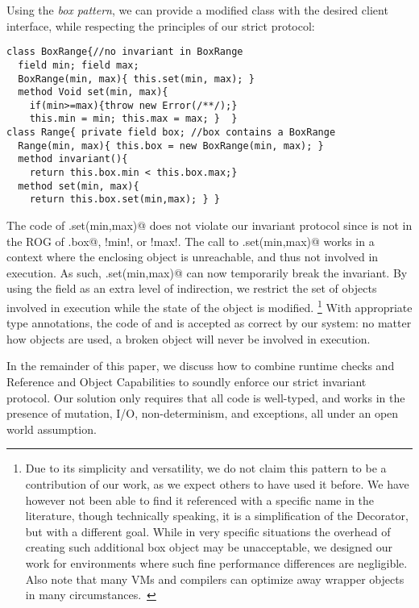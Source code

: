 Using the \emph{box pattern}, we can provide a modified
\Q@Range@ class with the desired client interface, while respecting the principles of our strict protocol:
\begin{lstlisting}
class BoxRange{//no invariant in BoxRange
  field min; field max;
  BoxRange(min, max){ this.set(min, max); }
  method Void set(min, max){
    if(min>=max){throw new Error(/**/);}
    this.min = min; this.max = max; }  }
class Range{ private field box; //box contains a BoxRange
  Range(min, max){ this.box = new BoxRange(min, max); }
  method invariant(){
    return this.box.min < this.box.max;}
  method set(min, max){
    return this.box.set(min,max); } }
\end{lstlisting}
The code of \Q@Range.set(min,max)@ does not violate our invariant protocol since \Q@this@ is not in the ROG of \Q@this.box@, \Q!min!, or \Q!max!. The call to
\Q@BoxRange.set(min,max)@ works in a context where the enclosing \Q@Range@ object is
unreachable, and thus not involved in execution. As such, \Q@Range.set(min,max)@ can now temporarily break the \Q@Range@ invariant.
By using the \Q@box@ field as an extra level of indirection, we restrict the set of objects involved in execution while the state of the object \Q@Range@ is modified.%
\footnote{Due to its simplicity and versatility, we do not claim this pattern to be a contribution of our work, as we expect others to have used it before. We have however not been able to find it referenced with a specific name in the literature, though technically speaking, it is a simplification of the Decorator, but with a different goal.
While in very specific situations the overhead of creating such additional box object may be unacceptable, we designed our work for environments where such fine performance differences are negligible.
Also note that many VMs and compilers can optimize away wrapper objects in many circumstances.~\cite{Bolz:2011:ARP:1929501.1929508}}
With appropriate type annotations, the code of \Q@Range@ and \Q@BoxRange@ is accepted as correct by our system: no matter how \Q@Range@ objects are used, a broken \Q@Range@ object will never be involved in execution.

In the remainder of this paper, we discuss how to combine runtime checks and Reference and Object Capabilities
to soundly enforce our strict invariant protocol.
Our solution only requires 
that all code is well-typed, and works in the presence of mutation, I/O, non-determinism, and exceptions, all under an open world assumption.


